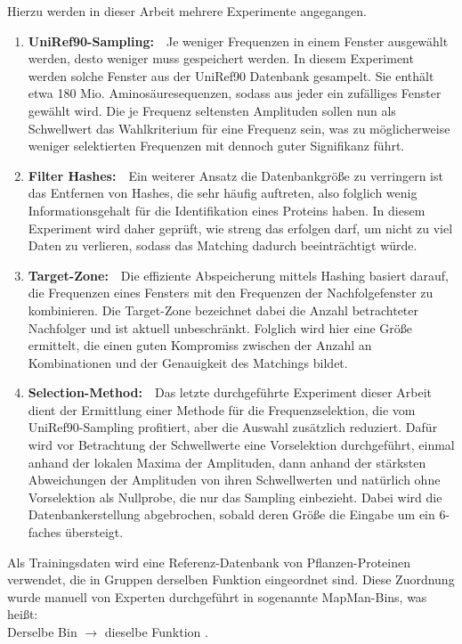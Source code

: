     Hierzu werden in dieser Arbeit mehrere Experimente angegangen.
    \begin{enumerate}
        \item \textbf{UniRef90-Sampling:}\ \ Je weniger Frequenzen in einem Fenster ausgewählt werden, desto weniger muss gespeichert werden. In diesem Experiment werden solche Fenster aus der UniRef90 Datenbank gesampelt. Sie enthält etwa 180 Mio. Aminosäuresequenzen, sodass aus jeder ein zufälliges Fenster gewählt wird. Die je Frequenz seltensten Amplituden sollen nun als Schwellwert das Wahlkriterium für eine Frequenz sein, was zu möglicherweise weniger selektierten Frequenzen mit dennoch guter Signifikanz führt.
        \item \textbf{Filter Hashes:}\ \ Ein weiterer Ansatz die Datenbankgröße zu verringern ist das Entfernen von Hashes, die sehr häufig auftreten, also folglich wenig Informationsgehalt für die Identifikation eines Proteins haben. In diesem Experiment wird daher geprüft, wie streng das erfolgen darf, um nicht zu viel Daten zu verlieren, sodass das Matching dadurch beeinträchtigt würde. 
        \item \textbf{Target-Zone:}\ \ Die effiziente Abspeicherung mittels Hashing basiert darauf, die Frequenzen eines Fensters mit den Frequenzen der Nachfolgefenster zu kombinieren. Die Target-Zone bezeichnet dabei die Anzahl betrachteter Nachfolger und ist aktuell unbeschränkt. Folglich wird hier eine Größe ermittelt, die einen guten Kompromiss zwischen der Anzahl an Kombinationen und der Genauigkeit des Matchings bildet.
        \item \textbf{Selection-Method:}\ \ Das letzte durchgeführte Experiment dieser Arbeit dient der Ermittlung einer Methode für die Frequenzselektion, die vom UniRef90-Sampling profitiert, aber die Auswahl zusätzlich reduziert. Dafür wird vor Betrachtung der Schwellwerte eine Vorselektion durchgeführt, einmal anhand der lokalen Maxima der Amplituden, dann anhand der stärksten Abweichungen der Amplituden von ihren Schwellwerten und natürlich ohne Vorselektion als Nullprobe, die nur das Sampling einbezieht. Dabei wird die Datenbankerstellung abgebrochen, sobald deren Größe die Eingabe um ein 6-faches übersteigt.
    \end{enumerate}
    Als Trainingsdaten wird eine Referenz-Datenbank von Pflanzen-Proteinen verwendet, die in Gruppen derselben Funktion eingeordnet sind. Diese Zuordnung wurde manuell von Experten durchgeführt in sogenannte MapMan-Bins, was heißt:\\Derselbe Bin $\rightarrow$ dieselbe Funktion \cite{mapman}.
